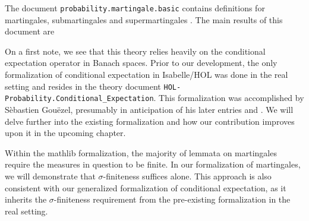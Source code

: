 The document \texttt{probability.martingale.basic} contains definitions for martingales, submartingales and supermartingales \cite{Degenne_Ying_2022}. The main results of this document are

On a first note, we see that this theory relies heavily on the conditional expectation operator in Banach spaces. Prior to our development, the only formalization of conditional expectation in Isabelle/HOL was done in the real setting and resides in the theory document \texttt{HOL-Probability.Conditional\_Expectation}. This formalization was accomplished by S\`ebastien Gou\"ezel, presumably in anticipation of his later entries \cite{Ergodic_Theory-AFP} and \cite{Lp-AFP}. We will delve further into the existing formalization and how our contribution improves upon it in the upcoming chapter.

Within the \textsf{mathlib} formalization, the majority of lemmata on martingales require the measures in question to be finite. In our formalization of martingales, we will demonstrate that $\sigma$-finiteness suffices alone. This approach is also consistent with our generalized formalization of conditional expectation, as it inherits the $\sigma$-finiteness requirement from the pre-existing formalization in the real setting.

